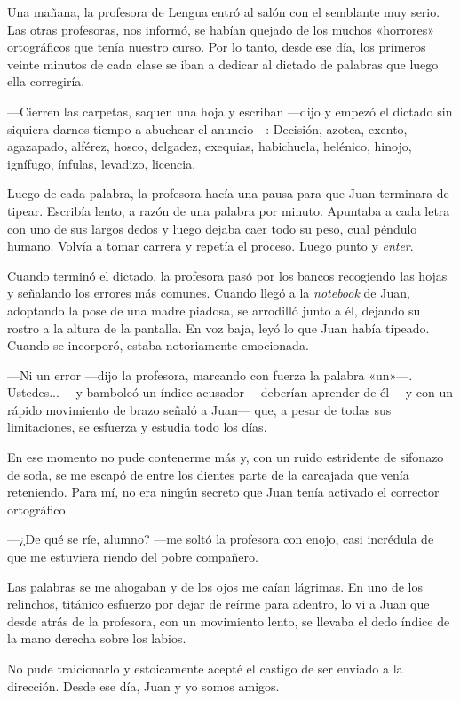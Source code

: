 \documentclass[11pt,twoside,openright]{book}
\begin{document}
 Una mañana, la profesora de Lengua entró al salón con el semblante muy serio.
 Las otras profesoras, nos informó, se habían quejado de los muchos «horrores»
 ortográficos que tenía nuestro curso. Por lo tanto, desde ese día, los primeros
 veinte minutos de cada clase se iban a dedicar al dictado de palabras que luego
 ella corregiría.
 
 ---Cierren las carpetas, saquen una hoja y escriban ---dijo y empezó el dictado
 sin siquiera darnos tiempo a abuchear el anuncio---: Decisión, azotea, exento,
 agazapado, alférez, hosco, delgadez, exequias, habichuela, helénico, hinojo,
 ignífugo, ínfulas, levadizo, licencia.
 
 Luego de cada palabra, la profesora hacía una pausa para que Juan terminara de
 tipear. Escribía lento, a razón de una palabra por minuto. Apuntaba a cada
 letra con uno de sus largos dedos y luego dejaba caer todo su peso, cual
 péndulo humano. Volvía a tomar carrera y repetía el proceso. Luego punto y
 \emph{enter}.
 
 Cuando terminó el dictado, la profesora pasó por los bancos recogiendo las
 hojas y señalando los errores más comunes. Cuando llegó a la \emph{notebook} de
 Juan, adoptando la pose de una madre piadosa, se arrodilló junto a él, dejando
 su rostro a la altura de la pantalla. En voz baja, leyó lo que Juan había
 tipeado. Cuando se incorporó, estaba notoriamente emocionada.
 
 ---Ni un error ---dijo la profesora, marcando con fuerza la palabra «un»---.
 Ustedes... ---y bamboleó un índice acusador--- deberían aprender de él ---y con
 un rápido movimiento de brazo señaló a Juan--- que, a pesar de todas sus
 limitaciones, se esfuerza y estudia todo los días.
 
 En ese momento no pude contenerme más y, con un ruido estridente de sifonazo de
 soda, se me escapó de entre los dientes parte de la carcajada que venía
 reteniendo. Para mí, no era ningún secreto que Juan tenía activado el corrector
 ortográfico.
 
 ---¿De qué se ríe, alumno? ---me soltó la profesora con enojo, casi incrédula
 de que me estuviera riendo del pobre compañero.
 
 Las palabras se me ahogaban y de los ojos me caían lágrimas. En uno de los
 relinchos, titánico esfuerzo por dejar de reírme para adentro, lo vi a Juan que
 desde atrás de la profesora, con un movimiento lento, se llevaba el dedo índice
 de la mano derecha sobre los labios.
 
 No pude traicionarlo y estoicamente acepté el castigo de ser enviado a la
 dirección. Desde ese día, Juan y yo somos amigos.
\end{document}
